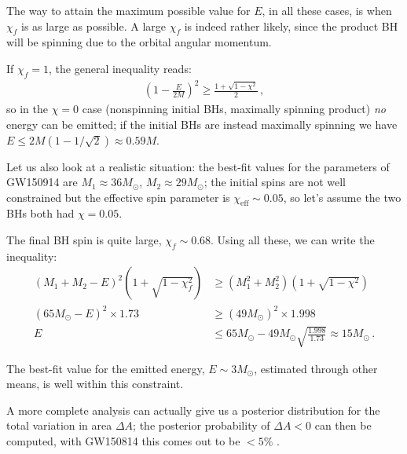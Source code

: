 \documentclass[main.tex]{subfiles}
\begin{document}
The way to attain the maximum possible value for \(E\), in all these cases, is when \(\chi _f\) is as large as possible. 
A large \(\chi _f\) is indeed rather likely, since the product BH will be spinning due to the orbital angular momentum. 

If \(\chi _f = 1\), the general inequality reads: 
%
\begin{align}
\left(1 - \frac{E}{2M}\right)^2 \geq \frac{1 + \sqrt{1 - \chi^2}}{2} 
\,,
\end{align}
%
so in the \(\chi = 0\) case (nonspinning initial BHs, maximally spinning product) \emph{no} energy can be emitted; if the initial BHs are instead maximally spinning we have \(E \leq 2M ( 1 - 1/\sqrt{2}) \approx 0.59 M\).

Let us also look at a realistic situation: the best-fit values for the parameters of GW150914 are \(M_1 \approx 36M_{\odot}\), \(M_2 \approx 29M_{\odot}\); the initial spins are not well constrained but the effective spin parameter is \(\chi _{\text{eff}} \sim 0.05\), so let's assume the two BHs both had \(\chi = 0.05\). 

The final BH spin is quite large, \(\chi _f \sim 0.68\). 
Using all these, we can write the inequality: %
\begin{align}
(M_1 + M_2 - E)^2 \left(1 + \sqrt{1 - \chi_f^2}\right) &\geq (M_1^2 + M_2^2 ) \left(1 + \sqrt{1 - \chi^2}\right)  \\
(65 M_{\odot} - E)^2 \times 1.73 &\geq (49 M_{\odot})^2 \times 1.998  \\
E &\leq 65M_{\odot} - 49 M_{\odot} \sqrt{\frac{1.998}{1.73}} \approx 15 M_{\odot}
\,.
\end{align}

The best-fit value for the emitted energy, \(E \sim 3M_{\odot}\), estimated through other means, is well within this constraint.

A more complete analysis can actually give us a posterior distribution for the total variation in area \(\Delta A\); the posterior probability of \(\Delta A < 0\) can then be computed, with GW150814 this comes out to be \(< 5\%\) \cite{isiTestingBlackholeArea2021}.
\end{document}

